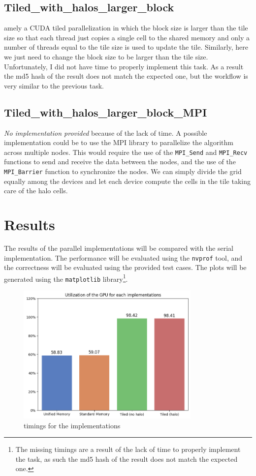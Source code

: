 \documentclass{article}
\begin{document}
\subsection{Tiled\_with\_halos\_larger\_block}
amely a CUDA tiled parallelization in which the block size is larger than the tile size so that each thread just copies a single cell to the shared memory and only a number of threads equal to the tile size is used to update the tile.
Similarly, here we just need to change the block size to be larger than the tile size. Unfortunately, I did not have time to properly implement this task. As a result the md5 hash of the result does not match the expected one, but the workflow is very similar to the previous task.

\subsection{Tiled\_with\_halos\_larger\_block\_MPI}

\textit{No implementation provided} because of the lack of time.
A possible implementation could be to use the MPI library to parallelize the algorithm across multiple nodes. This would require the use of the \texttt{MPI\_Send} and \texttt{MPI\_Recv} functions to send and receive the data between the nodes, and the use of the \texttt{MPI\_Barrier} function to synchronize the nodes. We can simply divide the grid equally among the devices and let each device compute the cells in the tile taking care of the halo cells.


\section{Results}
The results of the parallel implementations will be compared with the serial implementation. The performance will be evaluated using the \texttt{nvprof} tool, and the correctness will be evaluated using the provided test cases. The plots will be generated using the \texttt{matplotlib} library\footnote{The missing timings are a result of the lack of time to properly implement the task, as such the md5 hash of the result does not match the expected one.}.

\begin{figure}[htp]
	\centering
	\includegraphics[width=0.8\textwidth]{../image-1.png}
	\caption{timings for the implementations}
	\label{fig:timings}
\end{figure}
\end{document}
